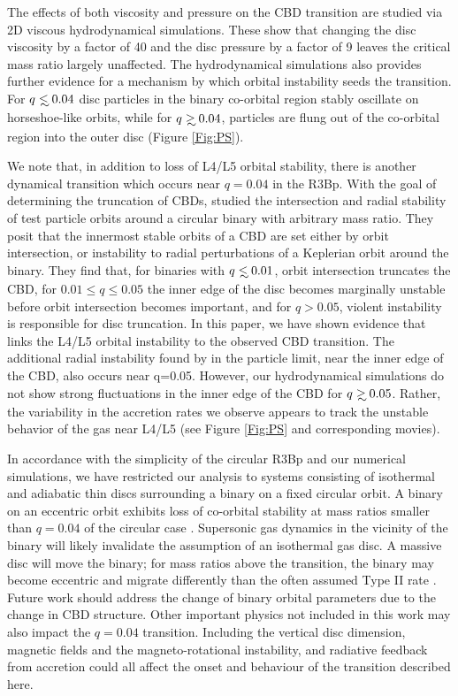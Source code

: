 The effects of both viscosity and pressure on the CBD transition are
studied via 2D viscous hydrodynamical simulations. These show that
changing the disc viscosity by a factor of 40 and the disc pressure by
a factor of 9 leaves the critical mass ratio largely unaffected.  The
hydrodynamical simulations also provides further evidence for a
mechanism by which orbital instability seeds the transition. For
$q\lsim 0.04$ disc particles in the binary co-orbital region stably
oscillate on horseshoe-like orbits, while for $q \gsim 0.04$,
particles are flung out of the co-orbital region into the outer disc
(Figure \ref{Fig:PS}).


We note that, in addition to loss of L4/L5 orbital stability, there is
another dynamical transition which occurs near $q=0.04$ in the
R3Bp. With the goal of determining the truncation of CBDs,
\cite{RP:Excretion:1981} studied the intersection and radial stability
of test particle orbits around a circular binary with arbitrary mass
ratio. They posit that the innermost stable orbits of a CBD are set
either by orbit intersection, or instability to radial perturbations
of a Keplerian orbit around the binary. They find that, for binaries
with $q \lsim 0.01$, orbit intersection truncates the CBD, for $0.01
\leq q \leq 0.05$ the inner edge of the disc becomes marginally
unstable before orbit intersection becomes important, and for
$q>0.05$, violent instability is responsible for disc truncation. In
this paper, we have shown evidence that links the L4/L5 orbital
instability to the observed CBD transition. The additional radial
instability found by \cite{RP:Excretion:1981} in the particle limit,
near the inner edge of the CBD, also occurs near q=0.05. However, our
hydrodynamical simulations do not show strong fluctuations in the
inner edge of the CBD for $q \gsim 0.05$. Rather, the variability in
the accretion rates we observe appears to track the unstable behavior
of the gas near L4/L5 (see Figure \ref{Fig:PS} and corresponding
movies).


In accordance with the simplicity of the circular R3Bp and our
numerical simulations, we have restricted our analysis to systems
consisting of isothermal and adiabatic thin discs surrounding a binary
on a fixed circular orbit. A binary on an eccentric orbit exhibits
loss of co-orbital stability at mass ratios smaller than $q=0.04$ of
the circular case \citep{eR3BStability:2013}. Supersonic gas dynamics
in the vicinity of the binary will likely invalidate the assumption of
an isothermal gas disc. A massive disc will move the binary; for mass
ratios above the transition, the binary may become eccentric
\citep{Cuadra:2009, Roedig:2011:eccevo,Roedig:2012:Trqs} and migrate
differently than the often assumed Type II rate
\cite[\textit{e.g.}][]{HKM09,DottiMM:2015}. Future work should address
the change of binary orbital parameters due to the change in CBD
structure. Other important physics not included in this work may also
impact the $q=0.04$ transition. Including the vertical disc dimension,
magnetic fields and the magneto-rotational instability, and radiative
feedback from accretion could all affect the onset and behaviour of
the transition described here.


